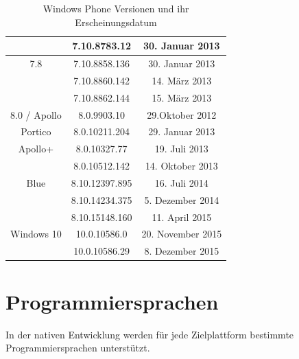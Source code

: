 \begin{table}[htbp]
{\begin{tabular}{|c|c|c|}
			& 7.10.8783.12                            & 30. Januar 2013                                   \\ \hline
			7.8                                      & 7.10.8858.136                           & 30. Januar 2013                                   \\ \hline
			& 7.10.8860.142                           & 14. März 2013                                     \\ \hline
			& 7.10.8862.144                           & 15. März 2013                                     \\ \hline
			8.0 / Apollo                             & 8.0.9903.10                             & 29.Oktober 2012                                   \\ \hline
			Portico                                  & 8.0.10211.204                           & 29. Januar 2013                                   \\ \hline
			Apollo+                                  & 8.0.10327.77                            & 19. Juli 2013                                     \\ \hline
			& 8.0.10512.142                           & 14. Oktober 2013                                  \\ \hline
			Blue                                     & 8.10.12397.895                          & 16. Juli 2014                                     \\ \hline
			& 8.10.14234.375                          & 5. Dezember 2014                                  \\ \hline
			& 8.10.15148.160                          & 11. April 2015                                    \\ \hline
			Windows 10                               & 10.0.10586.0                            & 20. November 2015                                 \\ \hline
			& 10.0.10586.29                           & 8. Dezember 2015                                  \\ \hline
		\end{tabular}
	}
	\caption{Windows Phone Versionen und ihr Erscheinungsdatum}
	\label{tab_WP_versions}\citep{WP7_version_releases, WP8_version_releases, WP10_version_releases}
\end{table}

\section{Programmiersprachen}
In der nativen Entwicklung werden für jede Zielplattform bestimmte Programmiersprachen unterstützt. 

